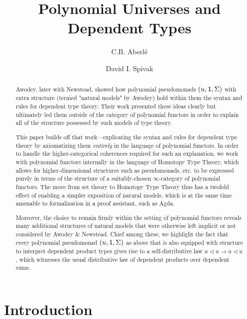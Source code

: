 \documentclass[
  11pt,
  oneside,
  article]{memoir}
\title{Polynomial Universes and Dependent Types}
\author{C.B. Aberlé \and David I. Spivak}
\date{}
\theoremstyle{definition}
\theoremstyle{plain}
\newcommand{\0}{\textsf{0}}
\newcommand{\1}{\tn{\textsf{1}}}
\newcommand{\tri}{\mathbin{\triangleleft}}
\begin{document}
\makeatletter
{}
\makeatother
\maketitle

\makeatletter
{}
\makeatother
\begin{abstract}

Awodey, later with Newstead, showed how polynomial pseudomonads $(u,\1,\Sigma)$ with extra structure (termed "natural models" by Awodey) hold within them the syntax and rules for dependent type theory. Their work presented these ideas clearly but ultimately led them outside of the category of polynomial functors in order to explain all of the structure possessed by such models of type theory.

This paper builds off that work---explicating the syntax and rules for dependent type theory by axiomatizing them \emph{entirely} in the language of polynomial functors. In order to handle the higher-categorical coherences required for such an explanation, we work with polynomial functors internally in the language of Homotopy Type Theory, which allows for higher-dimensional structures such as pseudomonads, etc. to be expressed purely in terms of the structure of a suitably-chosen $\infty$-category of polynomial functors. The move from set theory to Homotopy Type Theory thus has a twofold effect of enabling a simpler exposition of natural models, which is at the same time amenable to formalization in a proof assistant, such as Agda.

Moreover, the choice to remain firmly within the setting of polynomial functors reveals many additional structures of natural models that were otherwise left implicit or not considered by Awodey \& Newstead. Chief among these, we highlight the fact that every polynomial pseudomonad $(u,\1,\Sigma)$ as above that is also equipped with structure to interpret dependent product types gives rise to a self-distributive law $u\tri u\to u\tri u$, which witnesses the usual distributive law of dependent products over dependent sums.
\end{abstract}

\chapter{Introduction}\label{introduction}
\end{document}
